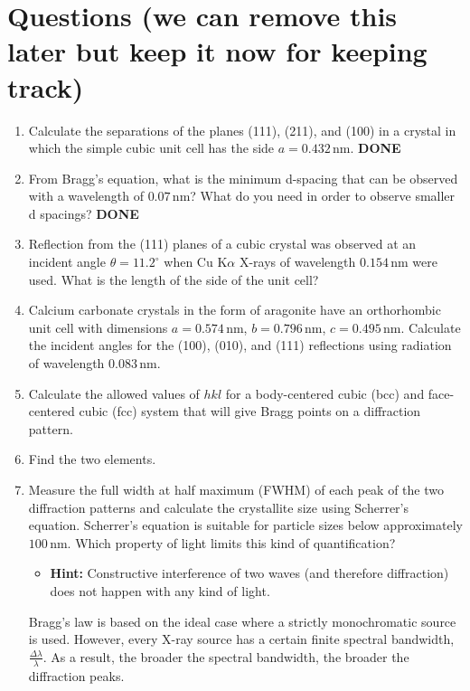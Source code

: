 \section*{Questions (we can remove this later but keep it now for keeping track)}

\begin{enumerate}
    \item Calculate the separations of the planes (111), (211), and (100) in a crystal in which the simple cubic unit cell has the side \( a = 0.432 \, \text{nm} \). \textbf{DONE}
    \item From Bragg’s equation, what is the minimum d-spacing that can be observed with a wavelength of \( 0.07 \, \text{nm} \)? What do you need in order to observe smaller d spacings? \textbf{DONE}
    \item Reflection from the (111) planes of a cubic crystal was observed at an incident angle \( \theta = 11.2^\circ \) when Cu K\(\alpha\) X-rays of wavelength \( 0.154 \, \text{nm} \) were used. What is the length of the side of the unit cell?
    \item Calcium carbonate crystals in the form of aragonite have an orthorhombic unit cell with dimensions \( a = 0.574 \, \text{nm} \), \( b = 0.796 \, \text{nm} \), \( c = 0.495 \, \text{nm} \). Calculate the incident angles for the (100), (010), and (111) reflections using radiation of wavelength \( 0.083 \, \text{nm} \).
    \item Calculate the allowed values of \( hkl \) for a body-centered cubic (bcc) and face-centered cubic (fcc) system that will give Bragg points on a diffraction pattern.
    \item Find the two elements.
    \item Measure the full width at half maximum (FWHM) of each peak of the two diffraction patterns and calculate the crystallite size using Scherrer’s equation. Scherrer’s equation is suitable for particle sizes below approximately \( 100 \, \text{nm} \). Which property of light limits this kind of quantification? 
    \begin{itemize}
        \item \textbf{Hint:} Constructive interference of two waves (and therefore diffraction) does not happen with any kind of light.
    \end{itemize}
    Bragg’s law is based on the ideal case where a strictly monochromatic source is used. However, every X-ray source has a certain finite spectral bandwidth, \( \frac{\Delta \lambda}{\lambda} \). As a result, the broader the spectral bandwidth, the broader the diffraction peaks.
    

\end{enumerate}
